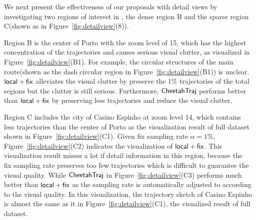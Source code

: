 We next present the effectiveness of our proposals with detail views by investigating two regions of interest in \pt{}, the dense region B and the sparse region C(shown as in Figure~\ref{fig:detailview}(8)).

Region B is the center of Porto with the zoom level of 15, which has the highest concentration of the trajectories and causes serious visual clutter, as visualized in Figure~\ref{fig:detailview}(B1).
For example, the circular structures of the main route(shown as the dash circular region in Figure~\ref{fig:detailview}(B1)) is unclear.
$\mathsf{local+fix}$ alleviates the visual clutter by preserve the $1\%$ trajectories of the total regions but the clutter is still serious. Furthermore, $\mathsf{CheetahTraj}$ performs better than $\mathsf{local+fix}$ by preserving less trajectories and reduce the visual clutter. 


Region C includes the city of Casino Espinho at zoom level 14, which contains less trajectories than the center of Porto as the visualization result of full dataset shown in Figure~\ref{fig:detailview}(C1). 
Given fix sampling rate $\alpha=1\%$, Figure~\ref{fig:detailview}(C2) indicates the visualization of $\mathsf{local+fix}$. This visualization result misses a lot if detail information in this region, because the fix sampling rate preserves too few trajectories which is difficult to guarantee the visual quality.
While $\mathsf{CheetahTraj}$ in Figure~\ref{fig:detailview}(C3) performs much better than $\mathsf{local+fix}$ as the sampling rate is automatically adjusted to according to the visual quality. In this visualization, the trajectory sketch of Casino Espinho is almost the same as it in Figure~\ref{fig:detailview}(C1), the visualized result of full dataset.
